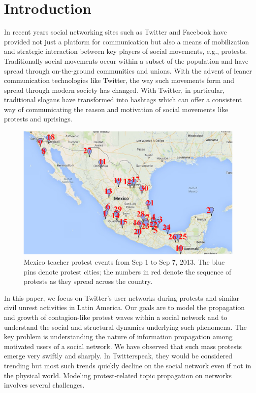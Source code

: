 \section{Introduction}
In recent years social networking sites such as Twitter and Facebook have
provided not just a platform for communication but also a means
of mobilization and strategic interaction between key players
of social movements, e.g., protests. Traditionally social movements occur
within a subset of the population and have spread through on-the-ground
communities and unions. With the advent of leaner communication
technologies like Twitter, the way such movements form and
spread through modern society has changed. With Twitter, in particular,
traditional slogans have transformed into hashtags which can
offer a consistent way of communicating the reason and
motivation of social movements like protests and uprisings.

\begin{figure}[h]
\centering
\includegraphics[scale=0.4]{figures/mexico_teacher_protest.png}
\caption{Mexico teacher protest events from Sep 1 to Sep 7, 2013. The blue pins denote protest cities; the numbers in red denote the sequence of
protests as they spread across the country.}
\label{fig:mexico_teacher}
\end{figure}


In this paper, we focus on Twitter's
user networks during protests
and similar civil unrest activities in Latin America. Our goals
are to model the propagation and growth of contagion-like protest
waves within a social network and to understand the social and
structural dynamics underlying such phenomena. The key problem
is understanding the nature of information propagation among motivated
users of a social network. We have observed that such mass
protests emerge very swiftly and sharply. In Twitterspeak, they
would be considered trending but most such trends quickly decline
on the social network even if not in the physical world. Modeling
protest-related topic propagation on networks involves several challenges.

